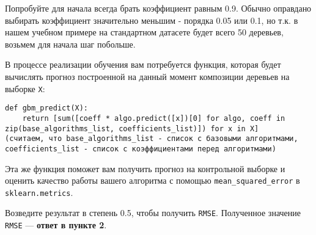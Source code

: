 \documentclass[11pt]{article}
\begin{document}
Попробуйте для начала всегда брать коэффициент равным 0.9. Обычно
оправдано выбирать коэффициент значительно меньшим - порядка 0.05 или
0.1, но т.к. в нашем учебном примере на стандартном датасете будет всего
50 деревьев, возьмем для начала шаг побольше.

В процессе реализации обучения вам потребуется функция, которая будет
вычислять прогноз построенной на данный момент композиции деревьев на
выборке \texttt{X}:

\begin{verbatim}
def gbm_predict(X):
    return [sum([coeff * algo.predict([x])[0] for algo, coeff in zip(base_algorithms_list, coefficients_list)]) for x in X]
(считаем, что base_algorithms_list - список с базовыми алгоритмами, coefficients_list - список с коэффициентами перед алгоритмами)
\end{verbatim}

Эта же функция поможет вам получить прогноз на контрольной выборке и
оценить качество работы вашего алгоритма с помощью
\texttt{mean\_squared\_error} в \texttt{sklearn.metrics}.

Возведите результат в степень 0.5, чтобы получить \texttt{RMSE}.
Полученное значение \texttt{RMSE} --- \textbf{ответ в пункте 2}.
\end{document}
